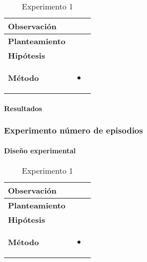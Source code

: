 \begin{table}[H]
    \centering
    \begin{tabularx}{\textwidth}{|p{4cm}|X|} %
        \hline %
        \textbf{Observación} &  
        \\ \hline 
        \textbf{Planteamiento} & 
        \\ \hline 
        \textbf{Hipótesis} & 
        \\ \hline 
        \textbf{Método} & 
        \begin{itemize}
            \item 
        \end{itemize}
        \\ \hline
    \end{tabularx}
    \caption{Experimento 1}
    \label{tab:tabla1}
\end{table}

\paragraph{Resultados}

\subsubsection{Experimento número de episodios}

\paragraph{Diseño experimental}

\begin{table}[H]
    \centering
    \begin{tabularx}{\textwidth}{|p{4cm}|X|} %
        \hline %
        \textbf{Observación} &  
        \\ \hline 
        \textbf{Planteamiento} & 
        \\ \hline 
        \textbf{Hipótesis} & 
        \\ \hline 
        \textbf{Método} & 
        \begin{itemize}
            \item 
        \end{itemize}
        \\ \hline
    \end{tabularx}
    \caption{Experimento 1}
    \label{tab:tabla1}
\end{table}

